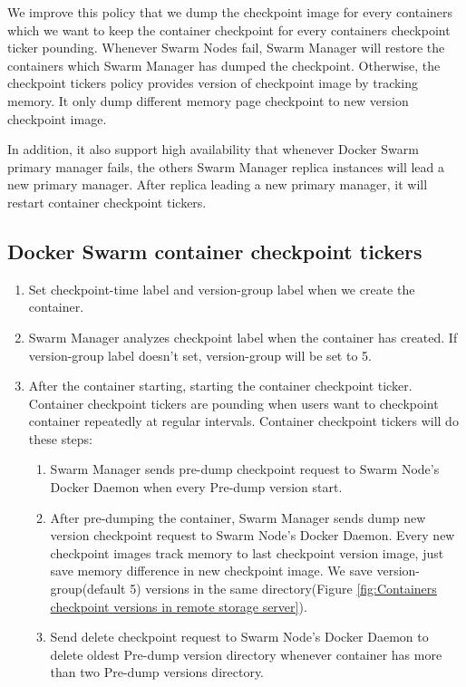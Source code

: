 We improve this policy that we dump the checkpoint image for every containers which we want to keep the container checkpoint for every containers checkpoint ticker pounding. Whenever Swarm Nodes fail, Swarm Manager will restore the containers which Swarm Manager has dumped the checkpoint. Otherwise, the checkpoint tickers policy provides version of checkpoint image by tracking memory. It only dump different memory page checkpoint to new version checkpoint image.

In addition, it also support high availability that whenever Docker Swarm primary manager fails, the others Swarm Manager replica instances will lead a new primary manager. After replica leading a new primary manager, it will restart container checkpoint tickers.

\subsection{Docker Swarm container checkpoint tickers}
\begin{enumerate}[Step 1.]
	\item Set checkpoint-time label and version-group label when we create the container.
    \item Swarm Manager analyzes checkpoint label when the container has created. If version-group label doesn't set, version-group will be set to 5.
    \item After the container starting, starting the container checkpoint ticker. Container checkpoint tickers are pounding when users want to checkpoint container repeatedly at regular intervals. Container checkpoint tickers will do these steps:
    \begin{enumerate}[Step a.]
    \item Swarm Manager sends pre-dump checkpoint request to Swarm Node's Docker Daemon when every Pre-dump version start.
    \item After pre-dumping the container, Swarm Manager sends dump new version checkpoint request to Swarm Node's Docker Daemon. Every new checkpoint images track memory to last checkpoint version image, just save memory difference in new checkpoint image. We save version-group(default 5) versions in the same directory(Figure \ref{fig:Containers checkpoint versions in remote storage server}).
    \item Send delete checkpoint request to Swarm Node's Docker Daemon to delete oldest Pre-dump version directory whenever container has more than two Pre-dump versions directory.
    \end{enumerate}
\end{enumerate}

